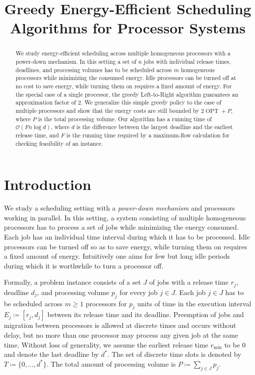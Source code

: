 \documentclass[a4paper]{article}
\title{Greedy Energy-Efficient Scheduling Algorithms for Processor Systems}
\DeclareMathOperator{\OPT}{OPT}
\begin{document}
%

\begin{abstract}
  We study energy-efficient scheduling across multiple homogeneous processors with a power-down mechanism.
  In this setting a set of $n$ jobs with individual release times, deadlines, and processing volumes has to be scheduled across $m$ homogeneous processors while minimizing the consumed energy.
  Idle processors can be turned off at no cost to save energy, while turning them on requires a fixed amount of energy.
  For the special case of a single processor, the greedy Left-to-Right algorithm guarantees an approximation factor of $2$.
  We generalize this simple greedy policy to the case of multiple processors and show that the energy costs are still bounded by $2 \OPT + P$, where $P$ is the total processing volume.
  Our algorithm has a running time of $\mathcal{O}(F n \log d)$, where $d$ is the difference between the largest deadline and the earliest release time, and $F$ is the running time required by a maximum-flow calculation for checking feasibility of an instance.
\end{abstract}
\clearpage

\tableofcontents
\clearpage

\section{Introduction}

We study a scheduling setting with a \emph{power-down mechanism} and processors working in parallel.
In this setting, a system consisting of multiple homogeneous processors has to process a set of jobs while minimizing the energy consumed.
Each job has an individual time interval during which it has to be processed.
Idle processors can be turned off so as to save energy, while turning them on requires a fixed amount of energy.
Intuitively one aims for few but long idle periods during which it is worthwhile to turn a processor off.

Formally, a problem instance consists of a set $J$ of jobs with a release time $r_j$, deadline $d_j$, and processing volume $p_j$ for every job $j \in J$.
Each job $j \in J$ has to be scheduled across $m \geq 1$ processors for $p_j$ units of time in the execution interval $E_j \coloneqq [r_j, d_j]$ between its release time and its deadline.
Preemption of jobs and migration between processors is allowed at discrete times and occurs without delay, but no more than one processor may process any given job at the same time.
Without loss of generality, we assume the earliest release time $r_{\min}$ to be $0$ and denote the last deadline by $d^*$.
The set of discrete time slots is denoted by $T \coloneqq \{0, \ldots, d^*\}$.
The total amount of processing volume is $P \coloneqq \sum_{j \in J} p_j$.
\end{document}
